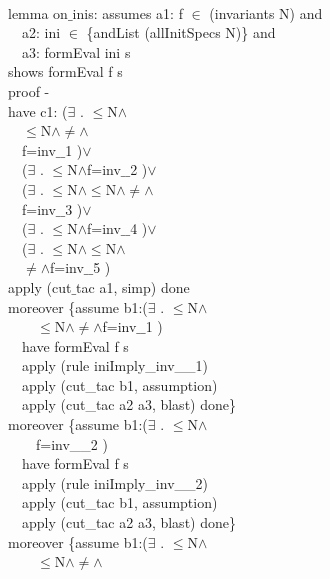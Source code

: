 \begin{specification}\\
lemma on$\_$inis:
assumes  a1: f $\in$ (invariants N) and \\
~~a2: ini $\in$ \{andList (allInitSpecs N)\} and \\
~~a3: formEval ini s\\
shows formEval f s\\
proof -\\
have c1: ($\exists$  . $\le$N$\wedge$ \\
~~$\le$N$\wedge$$\neq$$\wedge$\\
~~f=inv$\_$$\_$1   )$\vee$\\
~~($\exists$ . $\le$N$\wedge$f=inv$\_$$\_$2  )$\vee$\\
~~($\exists$  . $\le$N$\wedge$$\le$N$\wedge$$\neq$$\wedge$\\
~~f=inv$\_$$\_$3   )$\vee$\\
~~($\exists$ . $\le$N$\wedge$f=inv$\_$$\_$4  )$\vee$\\
~~($\exists$  . $\le$N$\wedge$$\le$N$\wedge$\\
~~$\neq$$\wedge$f=inv$\_$$\_$5   )\\
apply (cut$\_$tac a1, simp) done\\
moreover \{assume b1:($\exists$  . $\le$N$\wedge$\\
~~~~$\le$N$\wedge$$\neq$$\wedge$f=inv$\_$$\_$1   )\\
~~have formEval f s\\
~~apply (rule iniImply\_inv\_\_1)\\
~~apply (cut\_tac b1, assumption)\\
~~apply (cut\_tac a2 a3, blast) done\}\\
moreover \{assume b1:($\exists$ . $\le$N$\wedge$ \\
~~~~f=inv\_\_2  )\\
~~have formEval f s\\
~~apply (rule iniImply\_inv\_\_2)\\
~~apply (cut\_tac b1, assumption)\\
~~apply (cut\_tac a2 a3, blast) done\}\\
moreover \{assume b1:($\exists$  . $\le$N$\wedge$\\
~~~~$\le$N$\wedge$$\neq$$\wedge$\\

\end{specification}
